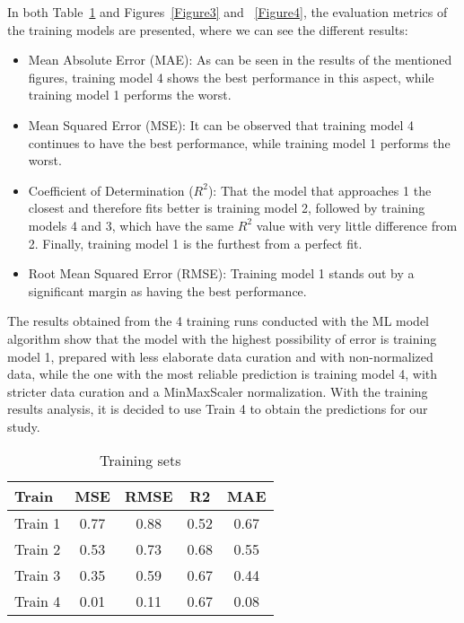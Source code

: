 \documentclass[final,times,twocolumn,article]{elsarticle}
\begin{document}
In both Table~\ref{Table2} and Figures~\ref{Figure3} and ~\ref{Figure4}, the evaluation metrics of the training models are presented, where we can see the different results: 

\begin{itemize}
\item Mean Absolute Error (MAE): As can be seen in the results of the mentioned figures, training model 4 shows the best performance in this aspect, while training model 1 performs the worst.
\item Mean Squared Error (MSE): It can be observed that training model 4 continues to have the best performance, while training model 1 performs the worst.
\item Coefficient of Determination ($R^2$): That the model that approaches 1 the closest and therefore fits better is training model 2, followed by training models 4 and 3, which have the same $R^2$ value with very little difference from 2. Finally, training model 1 is the furthest from a perfect fit.
\item Root Mean Squared Error (RMSE): Training model 1 stands out by a significant margin as having the best performance.
\end{itemize}

The results obtained from the 4 training runs conducted with the ML model algorithm show that the model with the highest possibility of error is training model 1, prepared with less elaborate data curation and with non-normalized data, while the one with the most reliable prediction is training model 4, with stricter data curation and a MinMaxScaler normalization. With the training results analysis, it is decided to use Train 4 to obtain the predictions for our study. 

\begin{table}[ht]
    \centering
    \begin{tabular}{l c c c c} 
         \hline
         Train & MSE & RMSE & R2 & MAE\\ 
         \hline
         Train 1 & 0.77 & 0.88 & 0.52 & 0.67\\
         \hline
         Train 2 & 0.53 & 0.73 & 0.68 & 0.55\\
         \hline
         Train 3 & 0.35 & 0.59 & 0.67 & 0.44\\ 
         \hline
         Train 4 & 0.01 & 0.11 & 0.67 & 0.08\\ 
         \hline
        \end{tabular}
    \caption{Training sets}
    \label{Table2}
    \end{table}
 
\end{document}
